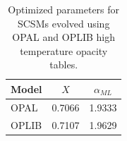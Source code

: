 \begin{table}
	\centering
	\begin{tabular}{l c c}
		\hline
		Model & $X$ & $\alpha_{ML}$ \\
		\hline
		\hline
		OPAL & 0.7066 & 1.9333 \\
		OPLIB & 0.7107 & 1.9629
	\end{tabular}
	\caption{Optimized parameters for SCSMs evolved using OPAL and OPLIB high
	temperature opacity tables.}
	\label{tab:SCSMResults}
\end{table}

